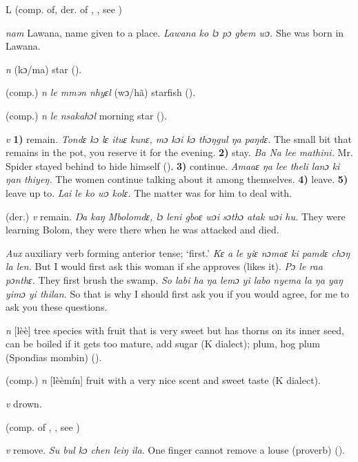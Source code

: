 \begin{letter}{L}
 (comp. of, der. of , , see ) 

 \textit{nam} Lawana, name given to a place. \textit{Lawana ko lɔ pɔ gbem wɔ.} She was born in Lawana.

 \textit{n} (kɔ/ma) star (\citealt{Pichl1967}).

 (comp.) \textit{n} \textit{le mmən nhyɛl} (wɔ/hã) starfish (\citealt{Pichl1967}).

 (comp.) \textit{n} \textit{le nsakahɔl} morning star (\citealt{Pichl1967}).

 \textit{v} \textbf{1)} remain. \textit{Tondɛ kɔ lɛ ituɛ kunɛ, mɔ kɔi kɔ thɔŋgul ŋa paŋdɛ.} The small bit that remains in the pot, you reserve it for the evening. \textbf{2)} stay. \textit{Ba Na lee mathini.} Mr. Spider stayed behind to hide himself (\citealt{Pichl1967}). \textbf{3)} continue. \textit{Amaaɛ ŋa lee theli lanɔ ki ŋan thiyeŋ.} The women continue talking about it among themselves. \textbf{4)} leave. \textbf{5)} leave up to. \textit{Lai le ko wɔ kolɛ.} The matter was for him to deal with.

 (der.) \textit{v} remain. \textit{Ŋa kaŋ Mbolomdɛ, lɔ leni gboɛ wɔi sɔthɔ atak wɔi hu.} They were learning Bolom, they were there when he was attacked and died.

 \textit{Aux} auxiliary verb forming anterior tense; ‘first.' \textit{Kɛ a le yiɛ nɔmaɛ ki pamdɛ chɔŋ la len.} But I would first ask this woman if she approves (likes it). \textit{Pɔ le raa pɔnthɛ.} They first brush the swamp. \textit{So labi ha ŋa lemɔ yi labo nyema la ŋa yaŋ yimɔ yi thilan.} So that is why I should first ask you if you would agree, for me to ask you these questions.

 \textit{n} [lèè] tree species with fruit that is very sweet but has thorns on its inner seed, can be boiled if it gets too mature, add sugar (K dialect); plum, hog plum (Spondias mombin) (\citealt{Pichl1967}). 

 (comp.) \textit{n} [lèèmín] fruit with a very nice scent and sweet taste (K dialect).

 \textit{v} drown.

 (comp. of , , see ) 

 \textit{v} remove. \textit{Su bul kɔ chen leiŋ ila}. One finger cannot remove a louse (proverb) (\citealt{TISLL1979}).


\end{letter}
